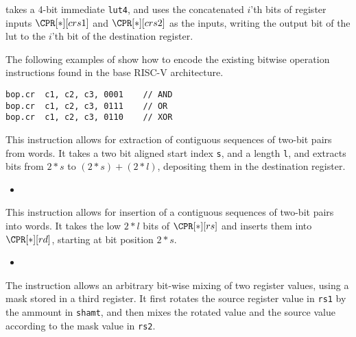  takes a 4-bit immediate {\tt lut4}, and uses the concatenated
$i$'th bits of register inputs $\CPR[*][crs1]$ and  $\CPR[*][crs2]$
as the inputs, writing the output bit of the lut to the $i$'th bit of the
destination register.

The following examples of  show how to encode the existing
bitwise operation instructions found in the base RISC-V architecture.

\begin{lstlisting}[style=float]
bop.cr  c1, c2, c3, 0001    // AND
bop.cr  c1, c2, c3, 0111    // OR 
bop.cr  c1, c2, c3, 0110    // XOR
\end{lstlisting}


\ienc{\iencextcr}

This instruction allows for extraction of contiguous sequences of two-bit
pairs from words.
It takes a two bit aligned start index {\tt s}, and a length
{\tt l}, and extracts bits from $2*s$ to $(2*s)+(2*l)$, depositing them in
the destination register.

\begin{itemize}
\item {}
\end{itemize}

\ienc{\iencinscr}

This instruction allows for insertion of a contiguous sequences of two-bit
pairs into words.
It takes the low $2*l$ bits of $\CPR[*][rs]$ and inserts them
into $\CPR[*][rd]$, starting at bit position $2*s$.

\begin{itemize}
\item {}
\end{itemize}

\ienc{\ienclmixcr\ienchmixcr}

The  instruction allows an arbitrary bit-wise mixing of two
register values, using a mask stored in a third register.
It first rotates  the source register value in {\tt rs1} by the ammount in
{\tt shamt}, and then mixes the rotated value and the source value according
to the mask value in {\tt rs2}.

